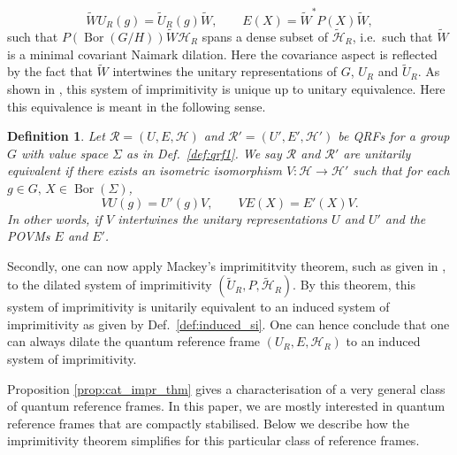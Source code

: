 \documentclass[sn-mathphys-num]{sn-jnl}%
\newcommand{\HH}{\mathcal{H}}
\DeclareMathOperator{\Bor}{Bor}
\numberwithin{equation}{section}
\theoremstyle{thmstyleone}%
\theoremstyle{thmstyletwo}%
\theoremstyle{thmstylethree}%
\newtheorem{definition}[theorem]{Definition}%
\begin{document}
\begin{equation}
    \tilde{W} U_R(g)=\tilde{U}_R(g)\tilde{W},\qquad E(X)=\tilde{W}^*P(X)\tilde{W},
\end{equation}
such that $P(\Bor(G/H))\tilde{W}\HH_R$ spans a dense subset of $\tilde{\HH}_R$, i.e.\ such that $\tilde{W}$ is a minimal covariant Naimark dilation. Here the covariance aspect is reflected by the fact that $\tilde{W}$ intertwines the unitary representations of $G$, $U_R$ and $\tilde{U}_R$. As shown in \cite[Prop.\ 1.]{Cattaneo:1979}, this system of imprimitivity is unique up to unitary equivalence. Here this equivalence is meant in the following sense.
\begin{definition}
    \label{def:qrf_equiv}
    Let $\mathcal{R}=(U,E,\HH)$ and $\mathcal{R}' =(U',E',\HH')$ be QRFs for a group $G$ with value space $\Sigma$ as in Def.~\ref{def:qrf1}. We say $\mathcal{R}$ and $\mathcal{R}'$ are \textup{unitarily equivalent} if there exists an isometric isomorphism $V:\HH\to \HH'$ such that for each $g\in G,\, X\in\Bor(\Sigma)$, 
    \begin{equation}
        VU(g)=U'(g)V,\qquad VE(X)=E'(X)V.
    \end{equation}
    In other words, if $V$ intertwines the unitary representations $U$ and $U'$ and the POVMs $E$ and $E'$.
\end{definition}

Secondly, one can now apply Mackey's imprimititvity theorem, such as given in \cite{kaniuth2012induced}, to the dilated system of imprimitivity $(\tilde{U}_R,P,\tilde{\HH}_R)$. By this theorem, this system of imprimitivity is unitarily equivalent to an induced system of imprimitivity as given by Def.\ \ref{def:induced_si}. One can hence conclude that one can always dilate the quantum reference frame $(U_R,E,\HH_R)$ to an induced system of imprimitivity.

Proposition \ref{prop:cat_impr_thm} gives a characterisation of a very general class of quantum reference frames. In this paper, we are mostly interested in quantum reference frames that are compactly stabilised. Below we describe how the imprimitivity theorem simplifies for this particular class of reference frames.
\end{document}
